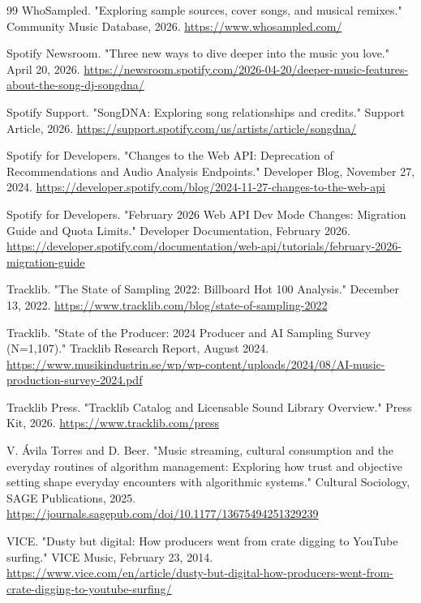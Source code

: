 \begin{thebibliography}{99}
  WhoSampled.
  "Exploring sample sources, cover songs, and musical remixes."
  Community Music Database, 2026. \url{https://www.whosampled.com/}

  Spotify Newsroom.
  "Three new ways to dive deeper into the music you love."
  April 20, 2026. \url{https://newsroom.spotify.com/2026-04-20/deeper-music-features-about-the-song-dj-songdna/}

  Spotify Support.
  "SongDNA: Exploring song relationships and credits."
  Support Article, 2026. \url{https://support.spotify.com/us/artists/article/songdna/}

  Spotify for Developers.
  "Changes to the Web API: Deprecation of Recommendations and Audio Analysis Endpoints."
  Developer Blog, November 27, 2024. \url{https://developer.spotify.com/blog/2024-11-27-changes-to-the-web-api}

  Spotify for Developers.
  "February 2026 Web API Dev Mode Changes: Migration Guide and Quota Limits."
  Developer Documentation, February 2026. \url{https://developer.spotify.com/documentation/web-api/tutorials/february-2026-migration-guide}

  Tracklib.
  "The State of Sampling 2022: Billboard Hot 100 Analysis."
  December 13, 2022. \url{https://www.tracklib.com/blog/state-of-sampling-2022}

  Tracklib.
  "State of the Producer: 2024 Producer and AI Sampling Survey (N=1,107)."
  Tracklib Research Report, August 2024. \url{https://www.musikindustrin.se/wp/wp-content/uploads/2024/08/AI-music-production-survey-2024.pdf}

  Tracklib Press.
  "Tracklib Catalog and Licensable Sound Library Overview."
  Press Kit, 2026. \url{https://www.tracklib.com/press}

  V. \'Avila Torres and D. Beer.
  "Music streaming, cultural consumption and the everyday routines of algorithm management: Exploring how trust and objective setting shape everyday encounters with algorithmic systems."
  Cultural Sociology, SAGE Publications, 2025. \url{https://journals.sagepub.com/doi/10.1177/13675494251329239}

  VICE.
  "Dusty but digital: How producers went from crate digging to YouTube surfing."
  VICE Music, February 23, 2014. \url{https://www.vice.com/en/article/dusty-but-digital-how-producers-went-from-crate-digging-to-youtube-surfing/}


\end{thebibliography}
